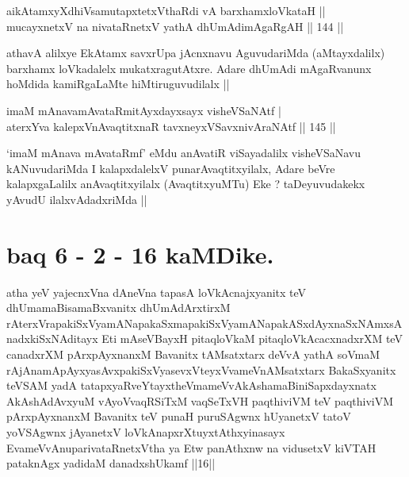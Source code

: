 
\begin{shl}
aikAtamxyXdhiVsamutapxtetxVthaRdi vA barxhamxloVkataH || \\
mucayxnetxV na nivataRnetxV yathA dhUmAdimAgaRgAH \hfill|| 144 || 
\end{shl}

\begin{artha}
athavA alilxye EkAtamx savxrUpa jAcnxnavu AguvudariMda (aMtayxdalilx)
barxhamx loVkadalelx mukatxragutAtxre. Adare dhUmAdi mAgaRvanunx
hoMdida kamiRgaLaMte hiMtiruguvudilalx ||
\end{artha}


\begin{shl}
imaM mAnavamAvataRmitAyxdayxsayx visheVSaNAtf | \\
aterxYva kalepxV\s nAvaqtitxnaR tavxneyxVSavxnivAraNAtf \hfill|| 145 || 
\end{shl}

\begin{artha}
`imaM mAnava mAvataRmf' eMdu anAvatiR viSayadalilx visheVSaNavu
  kANuvudariMda I kalapxdalelxV punarAvaqtitxyilalx, Adare beVre
  kalapxgaLalilx anAvaqtitxyilalx (AvaqtitxyuMTu) Eke ? taDeyuvudakekx
  yAvudU ilalxvAdadxriMda ||
\end{artha}

\section*{baq 6 - 2 - 16 kaMDike.}

\begin{shl}
atha yeV yajecnxVna dAneVna tapasA loVkAcnajxyanitx teV dhUmamaBisamaBxvanitx dhUmAdArxtirxM rAterxVrapakiSxVyamANapakaSxmapakiSxVyamANapakASxdAyxnaSxNAmxsAnadxkiSxNAditayx Eti mAseVBayxH pitaqloVkaM pitaqloVkAcacxnadxrXM teV canadxrXM pArxpAyxnanxM Bavanitx tAMsatxtarx deVvA yathA soVmaM rAjAnamApAyxyasAvxpakiSxVyasevxVteyxVvameVnAMsatxtarx BakaSxyanitx teVSAM yadA tatapxyaRveYtayxtheVmameVvAkAshamaBiniSapxdayxnatx AkAshAdAvxyuM vAyoVvaqRSiTxM vaqSeTxVH paqthiviVM teV paqthiviVM pArxpAyxnanxM Bavanitx teV punaH puruSAgwnx hUyanetxV tatoV yoVSAgwnx jAyanetxV loVkAnapxrXtuyxtAthxyinasayx EvameVvAnuparivataRnetxV\s tha ya Etw panAthxnw na vidusetxV kiVTAH pataknAgx yadidaM danadxshUkamf ||16||
\end{shl}

